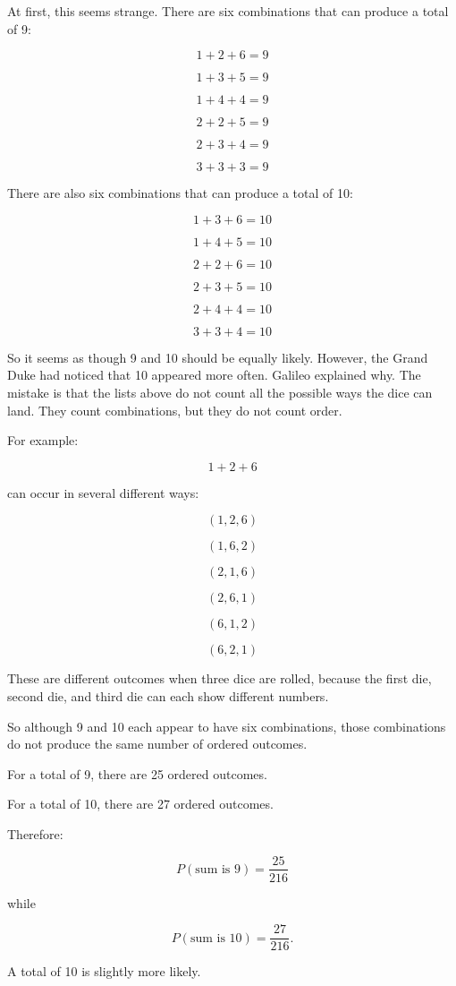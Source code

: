 \documentclass[
  letterpaper,
  DIV=11,
  numbers=noendperiod]{scrreprt}
\begin{document}
At first, this seems strange. There are six combinations that can
produce a total of 9:

\[
1+2+6 = 9
\]

\[
1+3+5 = 9
\]

\[
1+4+4 = 9
\]

\[
2+2+5 = 9
\]

\[
2+3+4 = 9
\]

\[
3+3+3 = 9
\]

There are also six combinations that can produce a total of 10:

\[
1+3+6 = 10
\]

\[
1+4+5 = 10
\]

\[
2+2+6 = 10
\]

\[
2+3+5 = 10
\]

\[
2+4+4 = 10
\]

\[
3+3+4 = 10
\]

So it seems as though 9 and 10 should be equally likely. However, the
Grand Duke had noticed that 10 appeared more often. Galileo explained
why. The mistake is that the lists above do not count all the possible
ways the dice can land. They count combinations, but they do not count
order.

For example:

\[
1+2+6
\]

can occur in several different ways:

\[
(1,2,6)
\]

\[
(1,6,2)
\]

\[
(2,1,6)
\]

\[
(2,6,1)
\]

\[
(6,1,2)
\]

\[
(6,2,1)
\]

These are different outcomes when three dice are rolled, because the
first die, second die, and third die can each show different numbers.

So although 9 and 10 each appear to have six combinations, those
combinations do not produce the same number of ordered outcomes.

For a total of 9, there are 25 ordered outcomes.

For a total of 10, there are 27 ordered outcomes.

Therefore:

\[
P(\text{sum is 9}) = \frac{25}{216}
\]

while

\[
P(\text{sum is 10}) = \frac{27}{216}.
\]

A total of 10 is slightly more likely.
\end{document}
